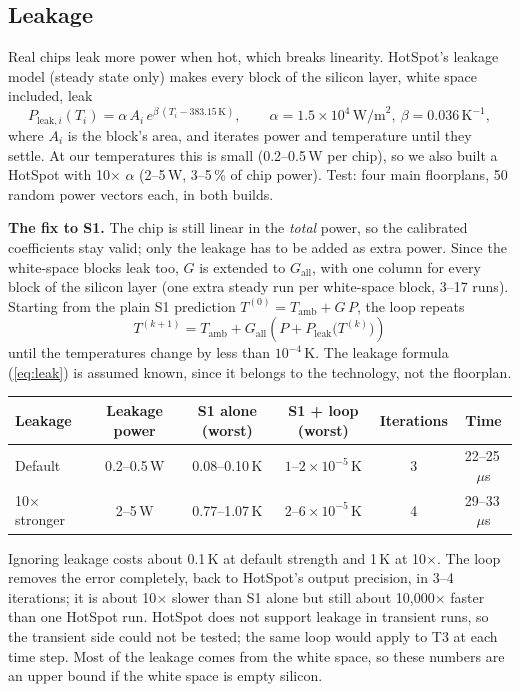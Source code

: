 \documentclass[11pt,a4paper]{article}
\newcommand{\us}{\,$\mu$s}
\begin{document}
\subsection{Leakage}
Real chips leak more power when hot, which breaks linearity. HotSpot's leakage model (steady state
only) makes every block of the silicon layer, white space included, leak
\begin{equation}
  P_{\text{leak},i}(T_i) = \alpha\, A_i\, e^{\beta\,(T_i - 383.15\,\text{K})},
  \qquad \alpha = 1.5\times10^{4}\,\text{W/m}^2,\ \beta = 0.036\,\text{K}^{-1},
  \label{eq:leak}
\end{equation}
where $A_i$ is the block's area, and iterates power and temperature until they settle. At our
temperatures this is small (0.2--0.5\,W per chip), so we also built a HotSpot with 10$\times$
$\alpha$ (2--5\,W, 3--5\,\% of chip power). Test: four main floorplans, 50 random power vectors
each, in both builds.

\textbf{The fix to S1.} The chip is still linear in the \emph{total} power, so the calibrated
coefficients stay valid; only the leakage has to be added as extra power. Since the white-space
blocks leak too, $G$ is extended to $G_\text{all}$, with one column for every block of the silicon
layer (one extra steady run per white-space block, 3--17 runs). Starting from the plain S1
prediction $T^{(0)} = T_\text{amb} + G\,P$, the loop repeats
\begin{equation}
  T^{(k+1)} = T_\text{amb} + G_\text{all}\left(P + P_\text{leak}\big(T^{(k)}\big)\right)
  \label{eq:leakloop}
\end{equation}
until the temperatures change by less than $10^{-4}$\,K. The leakage formula (\ref{eq:leak}) is
assumed known, since it belongs to the technology, not the floorplan.

\begin{center}
\small
\begin{tabular}{@{}l c c c c c@{}}
\toprule
Leakage & Leakage power & S1 alone (worst) & S1 + loop (worst) & Iterations & Time \\
\midrule
Default & 0.2--0.5\,W & 0.08--0.10\,K & $1$--$2\times10^{-5}$\,K & 3 & 22--25\us \\
10$\times$ stronger & 2--5\,W & 0.77--1.07\,K & $2$--$6\times10^{-5}$\,K & 4 & 29--33\us \\
\bottomrule
\end{tabular}
\end{center}
Ignoring leakage costs about 0.1\,K at default strength and 1\,K at 10$\times$. The loop removes
the error completely, back to HotSpot's output precision, in 3--4 iterations; it is about
10$\times$ slower than S1 alone but still about 10{,}000$\times$ faster than one HotSpot run.
HotSpot does not support leakage in transient runs, so the transient side could not be tested;
the same loop would apply to T3 at each time step. Most of the leakage comes from the white space,
so these numbers are an upper bound if the white space is empty silicon.
\end{document}
